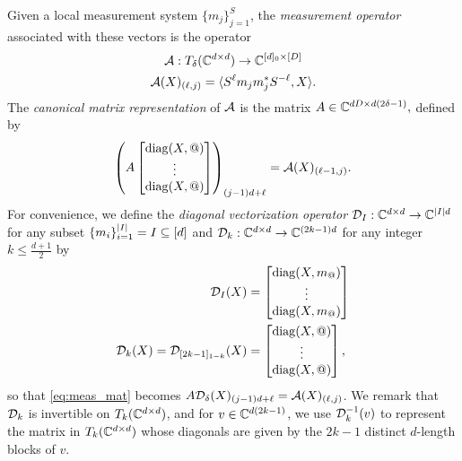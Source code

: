 \begin{definition}
  Given a local measurement system $\{m_j\}_{j = 1}^S$, the \emph{measurement operator} associated with these vectors is the operator
  \begin{gather}
    \mathcal{A} : T_\delta(\mathbb{C}^{d \times d}) \to \mathbb{C}^{[d]_0 \times [D]} \nonumber \\
    \mathcal{A}(X)_{(\ell, j)} = \langle S^{\ell} m_j m_j^* S^{-\ell}, X \rangle. \label{eq:meas_op}
  \end{gather}
  The \emph{canonical matrix representation} of $\mathcal{A}$ is the matrix $A \in \mathbb{C}^{d D \times d (2 \delta - 1)},$ defined by
  \begin{equation}
    \left(A \colmatfun{\diag(X, @)}{1 - \delta}{\delta - 1}\right)_{(j - 1) d + \ell} = \Ac(X)_{(\ell - 1, j)}.
    \label{eq:meas_mat}
  \end{equation}
  For convenience, we define the \emph{diagonal vectorization operator} $\mathcal{D}_I : \mathbb{C}^{d \times d} \to \mathbb{C}^{\lvert I\rvert d}$ for any subset $\{m_i\}_{i = 1}^{\lvert I\rvert} = I \subseteq [d]$ and $\mathcal{D}_k : \mathbb{C}^{d \times d} \to \mathbb{C}^{(2 k - 1) d}$ for any integer $k \le \frac{d + 1}{2}$ by
  \begin{align}
    \Dc_I(X) &= \colmatfun{\diag(X, m_@)}{1}{\abs{I}}
    \label{eq:diag_vec_set} \\
    \Dc_k(X) = \Dc_{[2 k - 1]_{1 - k}}(X) &= \colmatfun{\diag(X, @)}{1 - k}{k - 1},
    \label{eq:diag_vec}
  \end{align}
  so that \eqref{eq:meas_mat} becomes $A \mathcal{D}_{\delta} (X)_{(j - 1) d + \ell} = \mathcal{A}(X)_{(\ell, j)}$.  We remark that $\mathcal{D}_k$ is invertible on $T_k(\mathbb{C}^{d \times d})$, and for $v \in \mathbb{C}^{d (2 k - 1)}$, we use $\mathcal{D}_k^{-1}(v)$ to represent the matrix in $T_k(\mathbb{C}^{d \times d})$ whose diagonals are given by the $2k - 1$ distinct $d$-length blocks of $v$.
\end{definition}




